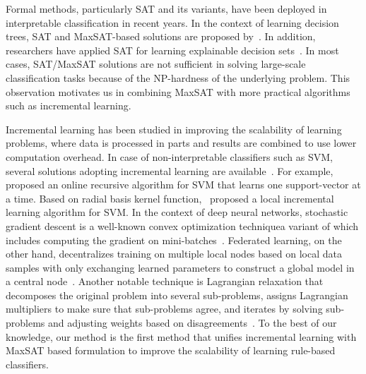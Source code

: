 Formal methods, particularly SAT and its variants, have been deployed in interpretable classification in recent years. In the context of learning decision trees, SAT and MaxSAT-based solutions are proposed by~\cite{alos2021learning,janota2020sat,narodytska2018learning,shati2021sat}. In addition, researchers have applied SAT for learning explainable decision sets~\cite{ignatiev2018sat,ignatiev2021scalable,schidler2021sat,yu2020computing}. In most cases, SAT/MaxSAT solutions are not sufficient in solving large-scale classification tasks because of the $ \mathrm{NP} $-hardness of the underlying problem. This observation motivates us in combining MaxSAT with more practical algorithms such as incremental learning.  


Incremental learning has been studied in improving the scalability of learning problems, where data is processed in parts and results are combined to use lower computation overhead. In case of non-interpretable classifiers such as SVM, several solutions adopting incremental learning are available~\cite{syed1999incremental,ruping2001incremental}. For example,~\cite{cauwenberghs2001incremental} proposed an online recursive algorithm for SVM that learns one support-vector at a time. Based on radial basis kernel function,~\cite{ralaivola2001incremental} proposed a local incremental learning algorithm for SVM. In the context of deep neural networks, stochastic gradient descent is a well-known convex optimization technique\textemdash a variant of which includes computing the gradient on mini-batches~\cite{hinton2012neural,li2014efficient,masters2018revisiting}.  Federated learning, on the other hand, decentralizes training on multiple local nodes based on local data samples with only exchanging learned parameters to construct a global model in a central node~\cite{konevcny2015federated,konevcny2016federated}. Another notable technique is Lagrangian relaxation that decomposes the original problem into several sub-problems, assigns Lagrangian multipliers to make sure that sub-problems agree, and iterates by solving sub-problems and adjusting weights based on disagreements~\cite{fisher1981lagrangian,johnson2007lagrangian,lemarechal2001lagrangian}. To the best of our knowledge, our method is the first method that unifies incremental learning with MaxSAT based formulation to improve the scalability of learning rule-based classifiers.


